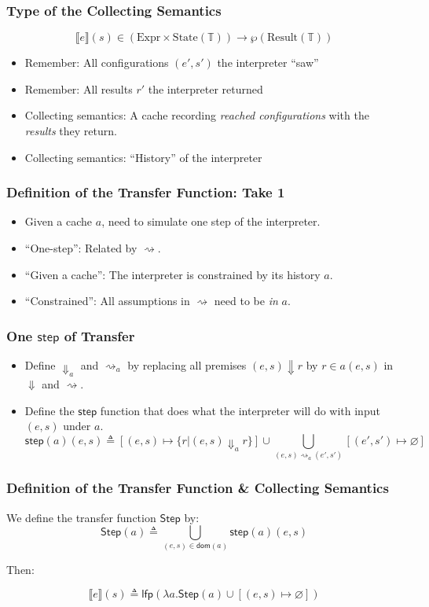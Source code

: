 \documentclass{beamer}
\newcommand*{\Expr}{\text{Expr}}
\newcommand*{\Time}{\mathbb{T}}
\newcommand*{\State}[1]{\text{State}({#1})}
\newcommand*{\Result}[1]{\text{Result}({#1})}
\newcommand*{\sembracket}[1]{\lBrack{#1}\rBrack}
\begin{document}
\begin{frame}[c]
  \frametitle{Type of the Collecting Semantics}
  \[\sembracket{e}(s)\in (\Expr\times\State{\Time})\rightarrow\wp(\Result{\Time})\]
  \begin{itemize}
    \item Remember: All configurations $(e',s')$ the interpreter ``saw''
    \item Remember: All results $r'$ the interpreter returned
    \item Collecting semantics: A cache recording \emph{reached configurations} with the \emph{results} they return.
    \item Collecting semantics: ``History'' of the interpreter
  \end{itemize}
\end{frame}
\begin{frame}[c]
  \frametitle{Definition of the Transfer Function: Take 1}
  \begin{itemize}
    \item Given a cache $a$, need to simulate one step of the interpreter.
    \item ``One-step'': Related by $\rightsquigarrow$.
    \item ``Given a cache'': The interpreter is constrained by its history $a$.
    \item ``Constrained'': All assumptions in $\rightsquigarrow$ need to be \emph{in} $a$.
  \end{itemize}
\end{frame}
\begin{frame}[c]
  \frametitle{One $\mathsf{step}$ of Transfer}

  \begin{itemize}
    \item Define ${\Downarrow}_{a}$ and ${\rightsquigarrow}_{a}$ by replacing all premises $(e,s)\Downarrow r$ by $r\in a(e,s)$ in $\Downarrow$ and $\rightsquigarrow$.
    \item Define the ${\mathsf{step}}$ function that does what the interpreter will do with input $(e,s)$ under $a$.
          \[
            \mathsf{step}(a)(e,s)\triangleq
            [(e,s)\mapsto\{r|(e,s){\Downarrow}_{a}r\}]
            \cup
            \bigcup_{(e,s)\rightsquigarrow_{a}(e',s')}[(e',s')\mapsto\varnothing]
          \]
  \end{itemize}
\end{frame}
\begin{frame}[c]
  \frametitle{Definition of the Transfer Function \& Collecting Semantics}
  We define the transfer function $\mathsf{Step}$ by:
  \[
    \mathsf{Step}(a)\triangleq
    \bigcup_{(e,s)\in\mathsf{dom}(a)}
    {\mathsf{step}(a)(e,s)}
  \]

  Then:
  \begin{definition}
    \[
      \sembracket{e}(s)\triangleq\mathsf{lfp}(\lambda a.\mathsf{Step}(a)\cup[(e,s)\mapsto\varnothing])
    \]
  \end{definition}
\end{frame}
\end{document}
